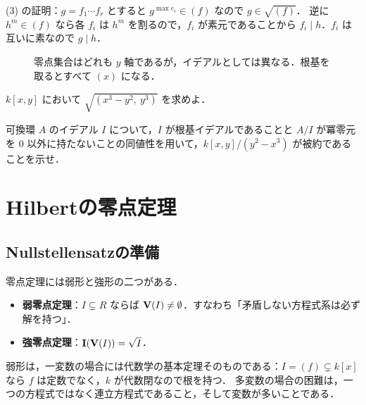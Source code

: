 (3) の証明：$g=f_1\cdots f_r$ とすると $g^{\max e_i}\in(f)$ なので $g\in\sqrt{(f)}$．
逆に $h^m\in(f)$ なら各 $f_i$ は $h^m$ を割るので，$f_i$ が素元であることから $f_i\mid h$．$f_i$ は互いに素なので $g\mid h$．

\begin{figure}[H]
\centering
{}
\caption{零点集合はどれも $y$ 軸であるが，イデアルとしては異なる．根基を取るとすべて $(x)$ になる．}
\label{fig:ch04-radical}
\end{figure}

 $k[x,y]$ において $\sqrt{(x^3-y^2,\ y^3)}$ を求めよ．

 可換環 $A$ のイデアル $I$ について，$I$ が根基イデアルであることと $A/I$ が冪零元を $0$ 以外に持たないことの同値性を用いて，$k[x,y]/(y^2-x^3)$ が被約であることを示せ．

\section{Hilbertの零点定理}

\subsection{Nullstellensatzの準備}

零点定理には弱形と強形の二つがある．
\begin{itemize}
  \item \textbf{弱零点定理}：$I\subsetneq R$ ならば $\mathbf{V}(I)\ne\emptyset$．すなわち「矛盾しない方程式系は必ず解を持つ」．
  \item \textbf{強零点定理}：$\mathbf{I}(\mathbf{V}(I))=\sqrt I$．
\end{itemize}
弱形は，一変数の場合には代数学の基本定理そのものである：$I=(f)\subsetneq k[x]$ なら $f$ は定数でなく，$k$ が代数閉なので根を持つ．
多変数の場合の困難は，一つの方程式ではなく連立方程式であること，そして変数が多いことである．

